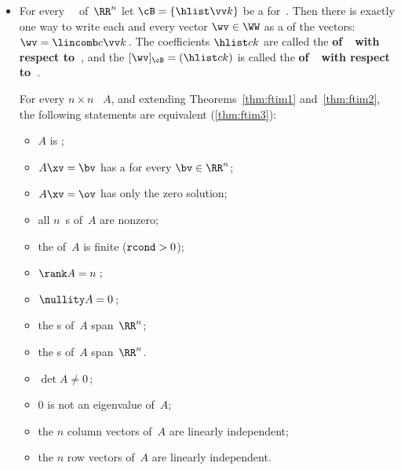\begin{itemize}
\itemme \autoref{pro:bfe} finds a  for a ~\WW\ specified as the solutions of a system of equations.
\begin{enumerate}
\item Rewrite the system of equations as the  system \(A\xv=\ov\) so that the subspace~\WW\ is the  of \(m\times n\) matrix~\(A\).
\item  Find an \svd\ factorisation \(A=\usv\) and let \(r=\rank A\) be the number of nonzero s (or effectively nonzero when the matrix has experimental errors).
\item The last \(n-r\) columns of~\(V\) form an  for the subspace~\WW.
\end{enumerate}

\item For every ~\WW\ of~\(\RR^n\) let \(\cB=\{\hlist\vv k\}\) be a  for~\WW.  
Then there is exactly one way to write each and every vector \(\wv\in\WW\) as a  of the  vectors: \(\wv=\lincomb c\vv k\)\,.
The coefficients \(\hlist ck\) are called the \textbf{ of~\wv\ with respect to~\cB}, and the  \([\wv]_{\cB}=(\hlist ck)\) is called the \textbf{ of~\wv\ with respect to~\cB}.

\itemme For every \(n\times n\) ~\(A\), and  
extending Theorems~\ref{thm:ftim1} and~\ref{thm:ftim2}, the following statements are equivalent (\autoref{thm:ftim3}):
\begin{itemize}
\item \(A\) is ;
\item \(A\xv=\bv\) has a  for every \(\bv\in\RR^n\);
\item \(A\xv=\ov\) has only the zero solution;
\item all \(n\)~s of~\(A\) are nonzero;
\item the  of~\(A\) is finite (\(\verb|rcond|>0\));
\item {}\(\rank A=n\)\,;
\item {}\(\nullity A=0\)\,;
\item the s of~\(A\) span~\(\RR^n\);
\item the s of~\(A\) span~\(\RR^n\).
\item \(\det A\neq 0\)\,;
\item \(0\) is not an eigenvalue of~\(A\);
\item the \(n\) column vectors of~\(A\) are linearly independent;
\item the \(n\) row vectors of~\(A\) are linearly independent.
\end{itemize}








\end{itemize}
